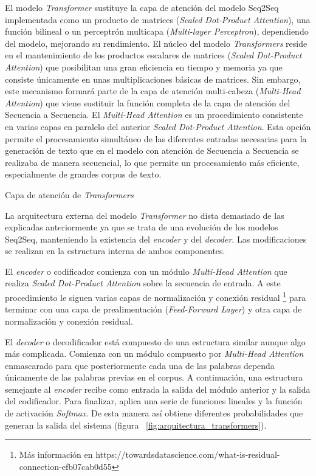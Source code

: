 El modelo \textit{Transformer} sustituye la capa de atención del modelo Seq2Seq implementada como un producto de matrices (\textit{Scaled Dot-Product Attention}), una función bilineal \citep{luong2015effective} o un perceptrón multicapa (\textit{Multi-layer Perceptron}), dependiendo del modelo, mejorando su rendimiento. El núcleo del modelo \textit{Transformers} reside en el mantenimiento de los productos escalares de matrices (\textit{Scaled Dot-Product Attention}) que posibilitan una gran eficiencia en tiempo y memoria ya que consiste únicamente en unas multiplicaciones básicas de matrices. Sin embargo, este mecanismo formará parte de la capa de atención multi-cabeza (\textit{Multi-Head Attention}) que viene sustituir la función completa de la capa de atención del Secuencia a Secuencia. 
El \textit{Multi-Head Attention} es un procedimiento consistente en varias capas en paralelo del anterior \textit{Scaled Dot-Product Attention}. Esta opción permite el procesamiento simultáneo de las diferentes entradas necesarias para la generación de texto que en el modelo con atención de Secuencia a Secuencia se realizaba de manera secuencial, lo que permite un procesamiento más eficiente, especialmente de grandes corpus de texto.


%
{Capa de atención de \textit{Transformers} \citep{atencion_capas}}



La arquitectura externa del modelo \textit{Transformer} no dista demasiado de las explicadas anteriormente ya que se trata de una evolución de los modelos Seq2Seq, manteniendo la existencia del \textit{encoder} y del \textit{decoder}. Las modificaciones se realizan en la estructura interna de ambos componentes. 

El \textit{encoder} o codificador comienza con un módulo \textit{Multi-Head Attention} que realiza \textit{Scaled Dot-Product Attention} sobre la secuencia de entrada. A este procedimiento le siguen varias capas de normalización y conexión residual \footnote{Más información en https://towardsdatascience.com/what-is-residual-connection-efb07cab0d55} para terminar con una capa de prealimentación (\textit{Feed-Forward Layer}) y otra capa de normalización y conexión residual. 

El \textit{decoder} o decodificador está compuesto de una estructura similar aunque algo más complicada. Comienza con un módulo compuesto por \textit{Multi-Head Attention} enmascarado para que posteriormente cada una de las palabras dependa únicamente de las palabras previas en el corpus. A continuación, una estructura semejante al \textit{encoder} recibe como entrada la salida del módulo anterior y la salida del codificador. Para finalizar, aplica una serie de funciones lineales y la función de activación \textit{Softmax}. De esta manera así obtiene diferentes probabilidades que generan la salida del sistema (figura ~\ref{fig:arquitectura_transformers}).



